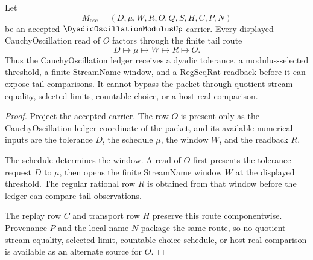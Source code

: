 \begin{theorem}
\label{thm:dyadic-oscillation-modulus-tail-handoff}
Let
$$
M_{\mathrm{osc}}=(D,\mu,W,R,O,Q,S,H,C,P,N)
$$
be an accepted $\DyadicOscillationModulusUp$ carrier. Every displayed CauchyOscillation read of $O$ factors through the finite tail route
$$
D \longmapsto \mu \longmapsto W \longmapsto R \longmapsto O .
$$
Thus the CauchyOscillation ledger receives a dyadic tolerance, a modulus-selected threshold, a finite StreamName window, and a RegSeqRat readback before it can expose tail comparisons. It cannot bypass the packet through quotient stream equality, selected limits, countable choice, or a host real comparison.
\end{theorem}
\begin{proof}
Project the accepted carrier. The row $O$ is present only as the CauchyOscillation ledger coordinate of the packet, and its available numerical inputs are the tolerance $D$, the schedule $\mu$, the window $W$, and the readback $R$.

The schedule determines the window. A read of $O$ first presents the tolerance request $D$ to $\mu$, then opens the finite StreamName window $W$ at the displayed threshold. The regular rational row $R$ is obtained from that window before the ledger can compare tail observations.

The replay row $C$ and transport row $H$ preserve this route componentwise. Provenance $P$ and the local name $N$ package the same route, so no quotient stream equality, selected limit, countable-choice schedule, or host real comparison is available as an alternate source for $O$.
\end{proof}

